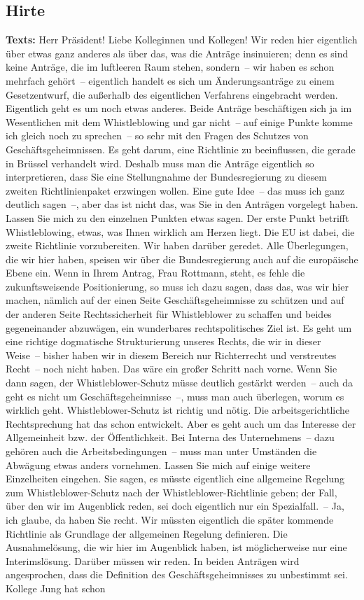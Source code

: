 \documentclass{article}
\begin{document}
\subsection{Hirte}
\noindent\textbf{Texts:} Herr Präsident! Liebe Kolleginnen und Kollegen! Wir reden hier eigentlich über etwas ganz anderes als über das, was die Anträge insinuieren; denn es sind keine Anträge, die im luftleeren Raum stehen, sondern – wir haben es schon mehrfach gehört – eigentlich handelt es sich um Änderungsanträge zu einem Gesetzentwurf, die außerhalb des eigentlichen Verfahrens eingebracht werden. Eigentlich geht es um noch etwas anderes. Beide Anträge beschäftigen sich ja im Wesentlichen mit dem Whistleblowing und gar nicht – auf einige Punkte komme ich gleich noch zu sprechen – so sehr mit den Fragen des Schutzes von Geschäftsgeheimnissen. Es geht darum, eine Richtlinie zu beeinflussen, die gerade in Brüssel verhandelt wird. Deshalb muss man die Anträge eigentlich so interpretieren, dass Sie eine Stellungnahme der Bundesregierung zu diesem zweiten Richtlinienpaket erzwingen wollen. Eine gute Idee – das muss ich ganz deutlich sagen –, aber das ist nicht das, was Sie in den Anträgen vorgelegt haben. Lassen Sie mich zu den einzelnen Punkten etwas sagen. Der erste Punkt betrifft Whistleblowing, etwas, was Ihnen wirklich am Herzen liegt. Die EU ist dabei, die zweite Richtlinie vorzubereiten. Wir haben darüber geredet. Alle Überlegungen, die wir hier haben, speisen wir über die Bundesregierung auch auf die europäische Ebene ein. Wenn in Ihrem Antrag, Frau Rottmann, steht, es fehle die zukunftsweisende Positionierung, so muss ich dazu sagen, dass das, was wir hier machen, nämlich auf der einen Seite Geschäftsgeheimnisse zu schützen und auf der anderen Seite Rechtssicherheit für Whistleblower zu schaffen und beides gegeneinander abzuwägen, ein wunderbares rechtspolitisches Ziel ist. Es geht um eine richtige dogmatische Strukturierung unseres Rechts, die wir in dieser Weise – bisher haben wir in diesem Bereich nur Richterrecht und verstreutes Recht – noch nicht haben. Das wäre ein großer Schritt nach vorne.  Wenn Sie dann sagen, der Whistleblower-Schutz müsse deutlich gestärkt werden – auch da geht es nicht um Geschäftsgeheimnisse –, muss man auch überlegen, worum es wirklich geht. Whistleblower-Schutz ist richtig und nötig. Die arbeitsgerichtliche Rechtsprechung hat das schon entwickelt. Aber es geht auch um das Interesse der Allgemeinheit bzw. der Öffentlichkeit. Bei Interna des Unternehmens – dazu gehören auch die Arbeitsbedingungen – muss man unter Umständen die Abwägung etwas anders vornehmen. Lassen Sie mich auf einige weitere Einzelheiten eingehen. Sie sagen, es müsste eigentlich eine allgemeine Regelung zum Whistleblower-Schutz nach der Whistle­blower-Richtlinie geben; der Fall, über den wir im Augenblick reden, sei doch eigentlich nur ein Spezialfall. – Ja, ich glaube, da haben Sie recht. Wir müssten eigentlich die später kommende Richtlinie als Grundlage der allgemeinen Regelung definieren. Die Ausnahmelösung, die wir hier im Augenblick haben, ist möglicherweise nur eine Interimslösung. Darüber müssen wir reden. In beiden Anträgen wird angesprochen, dass die Definition des Geschäftsgeheimnisses zu unbestimmt sei. Kollege Jung hat schon 
\end{document}
